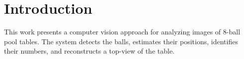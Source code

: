 \section{Introduction}
\label{sec:introduction}

This work presents a computer vision approach for analyzing images of 8-ball pool tables. The system detects the balls, estimates their positions, identifies their numbers, and reconstructs a top-view of the table.
